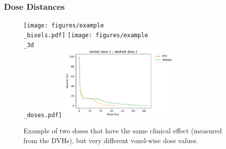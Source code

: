 \documentclass{beamer}
\begin{document}
	\begin{frame}
		\frametitle{Dose Distances}
	
		\begin{figure}
			\vspace{-0.5cm}
			\texttt{[image: figures/example\\\_bixels.pdf]}
			\texttt{[image: figures/example\\\_3d\\\_doses.pdf]}
			\vspace{-0.3cm}
			\includegraphics[width=6cm]{figures/example_dvh.pdf}
			
			\caption{Example of two doses that have the same clinical effect (measured from the DVHs), but very different voxel-wise dose values.}
		\end{figure}
		
	\end{frame}
	
	
\end{document}
